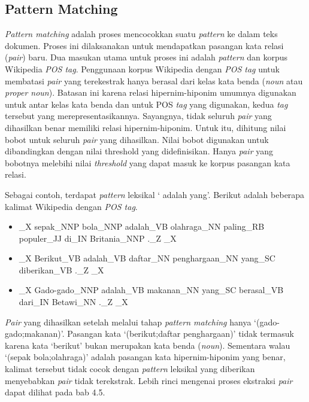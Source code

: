 \subsection{Pattern Matching}
\textit{Pattern matching} adalah proses mencocokkan suatu \textit{pattern} ke dalam teks dokumen. Proses ini dilaksanakan untuk mendapatkan pasangan kata relasi (\textit{pair}) baru. Dua masukan utama untuk proses ini adalah \textit{pattern} dan korpus Wikipedia \textit{POS tag}. Penggunaan korpus Wikipedia dengan \textit{POS tag} untuk membatasi \textit{pair} yang terekestrak hanya berasal dari kelas kata benda (\textit{noun} atau \textit{proper noun}). Batasan ini karena relasi hipernim-hiponim umumnya digunakan untuk antar kelas kata benda dan untuk POS \textit{tag} yang digunakan, kedua \textit{tag} tersebut yang merepresentasikannya. Sayangnya, tidak seluruh \textit{pair} yang dihasilkan benar memiliki relasi hipernim-hiponim. Untuk itu, dihitung nilai bobot untuk seluruh \textit{pair} yang dihasilkan. Nilai bobot digunakan untuk dibandingkan dengan nilai threshold yang didefinisikan. Hanya \textit{pair} yang bobotnya melebihi nilai \textit{threshold} yang dapat masuk ke korpus pasangan kata relasi.

Sebagai contoh, terdapat \textit{pattern} leksikal `{\tagHyponym} adalah {\tagHypernym} yang'. Berikut adalah beberapa kalimat Wikipedia dengan \textit{POS tag}.

\begin{itemize}
  \item {\tagStart}\_X sepak\_NNP bola\_NNP adalah\_VB olahraga\_NN paling\_RB populer\_JJ di\_IN Britania\_NNP .\_Z {\tagEnd}\_X
  \item {\tagStart}\_X Berikut\_VB adalah\_VB daftar\_NN penghargaan\_NN yang\_SC diberikan\_VB .\_Z {\tagEnd}\_X
  \item {\tagStart}\_X Gado-gado\_NNP adalah\_VB makanan\_NN yang\_SC berasal\_VB dari\_IN Betawi\_NN .\_Z {\tagEnd}\_X
\end{itemize}

\textit{Pair} yang dihasilkan setelah melalui tahap \textit{pattern matching} hanya `(gado-gado;makanan)'. Pasangan kata `(berikut;daftar penghargaan)' tidak termasuk karena kata `berikut' bukan merupakan kata benda (\textit{noun}). Sementara walau `(sepak bola;olahraga)' adalah pasangan kata hipernim-hiponim yang benar, kalimat tersebut tidak cocok dengan \textit{pattern} leksikal yang diberikan menyebabkan \textit{pair} tidak terekstrak. Lebih rinci mengenai proses ekstraksi \textit{pair} dapat dilihat pada bab 4.5.

